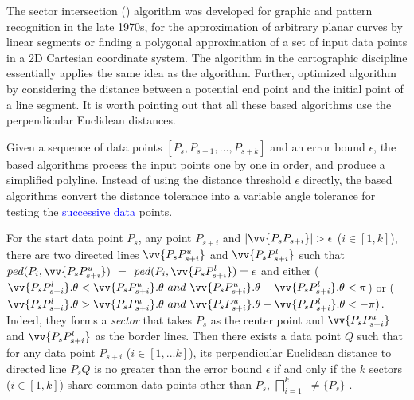 The sector intersection (\cia) algorithm \cite{Williams:Longest, Sklansky:Cone} was developed for graphic and pattern recognition in the late 1970s, for the approximation of arbitrary planar curves by linear segments or finding a polygonal approximation of a set of input data points in a 2D Cartesian coordinate system. The \sleeve algorithm \cite{Zhao:Sleeve} in the cartographic discipline essentially applies the same idea as the \cia algorithm.
Further, \cite{Dunham:Cone}  optimized algorithm \cia by considering the distance between a potential end point and the initial point of a line segment. It is worth pointing out that all these \cia based algorithms use the perpendicular Euclidean distances.


Given a sequence of data points $[P_{s}, P_{s+1}, \ldots, P_{s+k}]$ and an error bound $\epsilon$, the \cia based algorithms process the input points one by one in order, and produce a simplified polyline.  Instead of using the distance threshold $\epsilon$ directly, the \cia based algorithms convert the distance tolerance into a variable angle tolerance for testing the \textcolor{blue}{successive data} points.

For the start data point $P_s$, any point $P_{s+i}$ and $|\vv{P_sP_{s+i}}|>\epsilon$ ($i\in[1, k]$), there are two directed lines $\vv{P_sP^u_{s+i}}$ and $\vv{P_sP^l_{s+i}}$ such that $ped(P_i, \vv{P_sP^u_{s+i}})$ $=$ $ped(P_i, \vv{P_sP^l_{s+i}}) = \epsilon$ and either ($\vv{P_sP^l_{s+i}}.\theta < \vv{P_sP^u_{s+i}}.\theta ~and~\vv{P_sP^u_{s+i}}.\theta - \vv{P_sP^l_{s+i}}.\theta <\pi$) or ($\vv{P_sP^l_{s+i}}.\theta > \vv{P_sP^u_{s+i}}.\theta ~and~ \vv{P_sP^u_{s+i}}.\theta - \vv{P_sP^l_{s+i}}.\theta < -\pi)$. Indeed, they forms a \emph{sector}  that takes $P_s$ as the center point and $\vv{P_sP^u_{s+i}}$ and $\vv{P_sP^l_{s+i}}$ as the border lines.
Then there exists a data point $Q$ such that for any data point $P_{s+i}$ ($i \in [1, ... k]$), its perpendicular Euclidean distance to
directed line $\overline{P_sQ}$ is no greater than the error bound $\epsilon$ if and only if the $k$ sectors  ($i\in[1,k]$) share common data points other than $P_s$, \ie $\bigsqcap_{i=1}^{k}$ $\ne \{P_s\}$ \cite{Williams:Longest, Sklansky:Cone,Zhao:Sleeve}.

